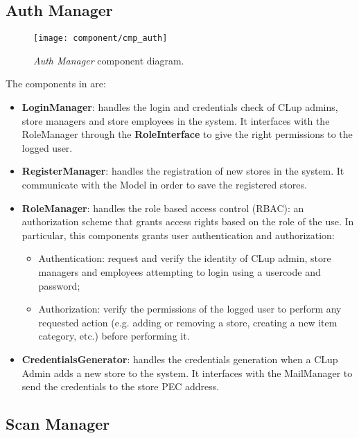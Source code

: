 \subsection{Auth Manager}

\begin{figure}[H]
	\centering
	\texttt{[image: component/cmp\_auth]}
	\caption{\textit{Auth Manager} component diagram.}
	\label{fig:cmp_auth}
\end{figure}

The components in  are:
\begin{itemize}
	\item \textbf{LoginManager}: handles the login and credentials check of CLup admins, store managers and store employees in the system. It interfaces with the RoleManager through the \textbf{RoleInterface} to give the right permissions to the logged user.
	
	\item \textbf{RegisterManager}: handles the registration of new stores in the system. It communicate with the Model in order to save the registered stores.
	
	\item \textbf{RoleManager}: handles the role based access control (RBAC): an authorization scheme that grants access rights based on the role of the use. In particular, this components grants user authentication and authorization:
	\begin{itemize}
		\item Authentication: request and verify the identity of CLup admin, store managers and employees attempting to login using a usercode and password;
		\item Authorization: verify the permissions of the logged user to perform any requested action (e.g. adding or removing a store, creating a new item category, etc.) before performing it.
	\end{itemize}
		
	\item \textbf{CredentialsGenerator}: handles the credentials generation when a CLup Admin adds a new store to the system. It interfaces with the MailManager to send the credentials to the store PEC address.
\end{itemize}


\subsection{Scan Manager}

